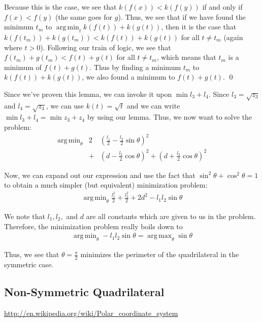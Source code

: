\documentclass[12pt]{amsart}   %
\DeclareMathOperator*{\argmin}{arg\,min}
\DeclareMathOperator*{\argmax}{arg\,max}
\begin{document}
Because this is the case, we see that $k(f(x)) < k(f(y))$ if and only if $f(x) < f(y)$ (the same goes for $g$). Thus, we see that if we have found the minimum $t_m$ to $\argmin_t k(f(t)) + k(g(t))$, then it is the case that $k(f(t_m)) + k(g(t_m)) < k(f(t)) + k(g(t))$ for all $t \neq t_m$ (again where $t > 0$). Following our train of logic, we see that $f(t_m) + g(t_m) < f(t) + g(t)$ for all $t \neq t_m$, which means that $t_m$ is a minimum of $f(t) + g(t)$. Thus by finding a minimum $t_m$ to $k(f(t)) + k(g(t))$, we also found a minimum to $f(t) + g(t)$. \qed

Since we've proven this lemma, we can invoke it upon $\min l_3 + l_4$. Since $l_3 = \sqrt{z_3}$ and $l_4 = \sqrt{z_4}$, we can use $k(t) = \sqrt{t}$ and we can write $\min l_3 + l_4 = \min z_3 + z_4$ by using our lemma. Thus, we now want to solve the problem:
\begin{eqnarray}
  \argmin_{\theta} &2& \left(\frac{l_1}{2} - \frac{l_2}{2} \sin \theta \right)^2 \\
  &+& \left( d - \frac{l_2}{2} \cos \theta \right)^2 + \left( d + \frac{l_2}{2} \cos \theta \right)^2
\end{eqnarray}

Now, we can expand out our expression and use the fact that $\sin^2 \theta + \cos^2 \theta = 1$ to obtain a much simpler (but equivalent) minimization problem:
\begin{eqnarray}
  \argmin_{\theta} \frac{l_1^2}{2} + \frac{l_2^2}{2} + 2d^2 - l_1 l_2 \sin \theta
\end{eqnarray}

We note that $l_1, l_2,$ and $d$ are all constants which are given to us in the problem. Therefore, the minimization problem really boils down to
\begin{eqnarray}
  \argmin_{\theta} - l_1 l_2 \sin \theta = \argmax_{\theta} \sin \theta
\end{eqnarray}

Thus, we see that $\theta = \frac{\pi}{2}$ minimizes the perimeter of the quadrilateral in the symmetric case.

\subsection{Non-Symmetric Quadrilateral}




\begin{thebibliography}{9}
\url{http://en.wikipedia.org/wiki/Polar_coordinate_system}
\end{thebibliography}
\end{document}
